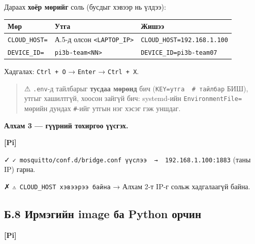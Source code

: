 Дараах \textbf{хоёр мөрийг} соль (бусдыг хэвээр нь үлдээ):

\begingroup\scriptsize\begin{longtable}[]{@{}lll@{}}
\toprule
Мөр & Утга & Жишээ\tabularnewline
\midrule
\endhead
\texttt{CLOUD\_HOST=} & А.5-д олсон \texttt{\textless{}LAPTOP\_\allowbreak{}IP\textgreater{}} & \texttt{CLOUD\_\allowbreak{}HOST=\allowbreak{}192.\allowbreak{}168.\allowbreak{}1.\allowbreak{}100}\tabularnewline
\texttt{DEVICE\_ID=} & \texttt{pi3b-team\textless{}NN\textgreater{}} & \texttt{DEVICE\_\allowbreak{}ID=\allowbreak{}pi3b-team07}\tabularnewline
\bottomrule
\end{longtable}\endgroup

Хадгалах: \texttt{Ctrl\ +\ O} → \texttt{Enter} → \texttt{Ctrl\ +\ X}.

\begin{quote}
⚠ \texttt{.env}-д тайлбарыг \textbf{тусдаа мөрөнд} бич (\texttt{KEY=\allowbreak{}утга\ \ \#\ тайлбар} БИШ), утгыг хашилтгүй, хоосон зайгүй бич: systemd-ийн \texttt{EnvironmentFile=} мөрийн дундах \texttt{\#}-ийг утгын нэг хэсэг гэж уншдаг.
\end{quote}

\textbf{Алхам 3 --- гүүрний тохиргоо үүсгэх.}

\textbf{{[}Pi{]}}

\begin{Shaded}
\begin{Highlighting}[]
\end{Highlighting}
\end{Shaded}

✓ \texttt{✓\ mosquitto/\allowbreak{}conf.\allowbreak{}d/\allowbreak{}bridge.\allowbreak{}conf\ үүслээ\ \ →\ \ 192.\allowbreak{}168.\allowbreak{}1.\allowbreak{}100:\allowbreak{}1883} (таны IP) гарна.

✗ \texttt{⚠\ CLOUD\_\allowbreak{}HOST\ хэвээрээ\ байна} → Алхам 2-т IP-г сольж хадгалаагүй байна.

\hypertarget{ux431.8-ux438ux440ux43cux44dux433ux438ux439ux43d-image-ux431ux430-python-ux43eux440ux447ux438ux43d}{%
\subsection{Б.8 Ирмэгийн image ба Python орчин}\label{ux431.8-ux438ux440ux43cux44dux433ux438ux439ux43d-image-ux431ux430-python-ux43eux440ux447ux438ux43d}}

\textbf{{[}Pi{]}}

\begin{Shaded}
\begin{Highlighting}[]
\end{Highlighting}
\end{Shaded}

